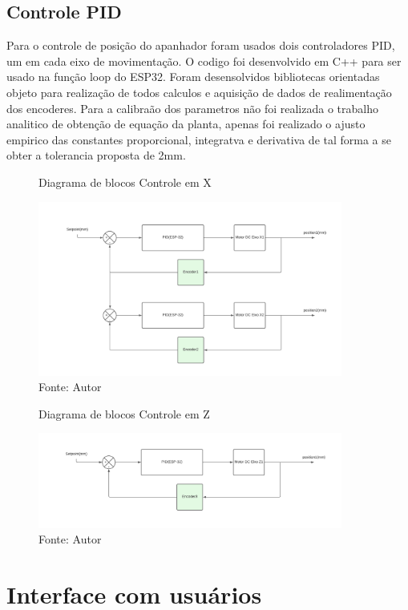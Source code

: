 \documentclass[../poliXuniversity_hospital_(USP)_report.tex]{subfiles}
\begin{document}
\subsection{Controle PID}

Para o controle de posição do apanhador foram usados dois controladores PID, um em cada eixo de movimentação. O codigo foi desenvolvido em C++ para ser usado na função loop do ESP32. Foram desensolvidos bibliotecas orientadas objeto para realização de todos calculos e aquisição de dados de realimentação dos encoderes. Para a calibraão dos parametros não foi realizada o trabalho analitico de obtenção de equação da planta, apenas foi realizado o ajusto empirico das constantes proporcional, integratva e derivativa de tal forma a se obter a tolerancia proposta de 2mm.

\begin{figure}[h]
\centering
     \caption{Diagrama de blocos Controle em X}
        \centering %
        \includegraphics[width=10cm]{images/Diagrama de blocos X.pdf}
        \caption*{Fonte: Autor}
        \label{figura: Diagrama de blocos Controle em X}
\end{figure}

\begin{figure}[h]
\centering
    \caption{Diagrama de blocos Controle em Z}
        \centering %
        \includegraphics[width=10cm]{images/Diagrama de blocos Z.pdf}
        \caption*{Fonte: Autor}
        \label{figura: Diagrama de blocos Controle em Z}
\end{figure}


\section{Interface com usuários}
\end{document}
